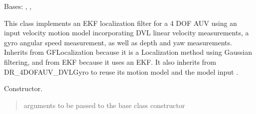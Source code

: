 \documentclass[letterpaper,10pt,english]{sphinxmanual}
\begin{document}
\begin{fulllineitems}
\label{\detokenize{GFLocalization:EKF_4DOFAUV_InputVelocityMM_DVLDepthYawOM.EKF_4DOFAUV_InputVelocityMM_DVLDepthYawOM}}
\pysigstartsignatures
{}
\pysigstopsignatures
\sphinxAtStartPar
Bases: {\hyperref[\detokenize{GFLocalization:GFLocalization.GFLocalization}]{}}, {\hyperref[\detokenize{DRLocalization:DR_4DOFAUV_DVLGyro.DR_4DOFAUV_DVLGyro}]{}}, {\hyperref[\detokenize{EKF:EKF.EKF}]{}}

\sphinxAtStartPar
This class implements an EKF localization filter for a 4 DOF AUV using an input velocity motion model  incorporating
DVL linear velocity measurements, a gyro angular speed measurement, as well as depth and yaw measurements.
Inherits from GFLocalization because it is a Localization method using Gaussian filtering, and from EKF because it uses an EKF.
It also inherits from DR\_4DOFAUV\_DVLGyro to reuse its motion model  and the model input .

\begin{fulllineitems}
\label{\detokenize{GFLocalization:EKF_4DOFAUV_InputVelocityMM_DVLDepthYawOM.EKF_4DOFAUV_InputVelocityMM_DVLDepthYawOM.__init__}}
\pysigstartsignatures
{}
\pysigstopsignatures
\sphinxAtStartPar
Constructor.
\begin{quote}\begin{description}
\sphinxAtStartPar
{} \textendash{} arguments to be passed to the base class constructor


\end{description}
\end{quote}
\end{fulllineitems}
\end{fulllineitems}
\end{document}
